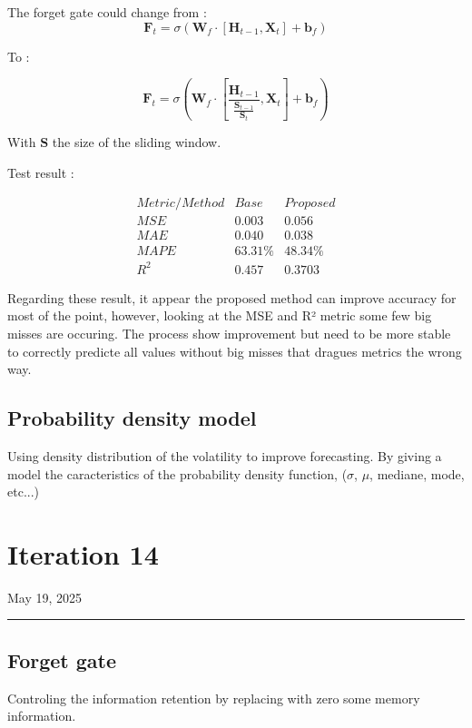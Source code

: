 \documentclass[letterpaper,11pt]{article}
\begin{document}
The forget gate could change from :
\[
\mathbf{F}_t = \sigma(\mathbf{W}_f \cdot [\mathbf{H}_{t-1}, \mathbf{X}_t] + \mathbf{b}_f)
\]

To :



\[
\mathbf{F}_t = \sigma(\mathbf{W}_f \cdot [\frac{\mathbf{H}_{t-1}}{\frac{\mathbf{S}_{t-1}}{\mathbf{S}_{t}}}, \mathbf{X}_t] + \mathbf{b}_f)
\]

With $\mathbf{S}$ the size of the sliding window.
\bigskip

Test result : 

\bigskip
\[
\begin{array}{ccc}
Metric/Method & Base & Proposed \\
\hline
MSE & 0.003 & 0.056\\
MAE & 0.040 & 0.038 \\
MAPE & 63.31\% & 48.34\%  \\
R^{2} & 0.457 & 0.3703 
\end{array}
\]

\bigskip

Regarding these result, it appear the proposed method can improve accuracy for most of the point, however, looking at the MSE and R² metric some few big misses are occuring. The process show improvement but need to be more stable to correctly predicte all values without big misses that dragues metrics the wrong way.




\subsection*{Probability density model}
Using density distribution of the volatility to improve forecasting. By giving a model the caracteristics of the probability density function, ($\sigma$, $\mu$, mediane, mode, etc...)




\newpage
\section*{Iteration 14}
\begin{flushright}
May 19, 2025
\end{flushright}
\hrule
\vspace{0.2in}

\subsection*{Forget gate}
Controling the information retention by replacing with zero some memory information.
\end{document}
